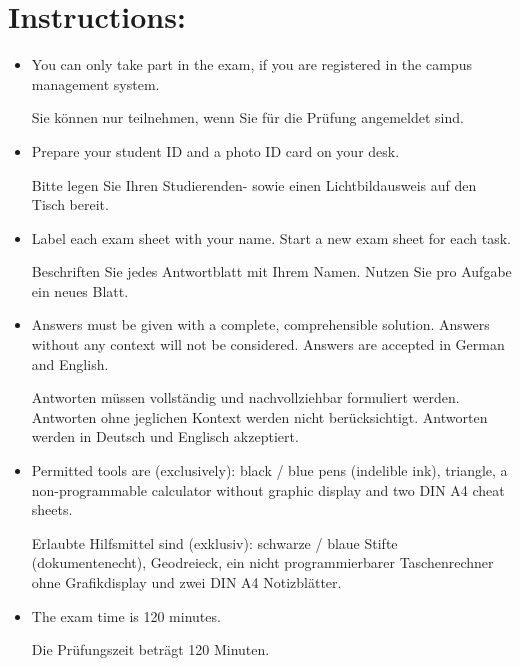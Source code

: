 \section*{\hspace*{2mm}Instructions:}
\begin{itemize}
	\item You can only take part in the exam, if you are registered in the campus management system.

	      \begin{germanblock}
		      Sie können nur teilnehmen, wenn Sie für die Prüfung angemeldet sind.
	      \end{germanblock}
	\item Prepare your student ID and a photo ID card on your desk.

	      \begin{germanblock}
		      Bitte legen Sie Ihren Studierenden- sowie einen Lichtbildausweis auf den Tisch bereit.
	      \end{germanblock}
	\item Label each exam sheet with your name. Start a new exam sheet for each task.

	      \begin{germanblock}
		      Beschriften Sie jedes Antwortblatt mit Ihrem Namen. Nutzen Sie pro  Aufgabe ein neues Blatt.
	      \end{germanblock}
	\item Answers must be given with a complete, comprehensible solution. Answers without any context will not be considered. Answers are accepted in German and English.

	      \begin{germanblock}
		      Antworten müssen vollständig und nachvollziehbar formuliert werden. Antworten ohne jeglichen Kontext werden nicht berücksichtigt. Antworten werden in Deutsch und Englisch akzeptiert.
	      \end{germanblock}
	\item Permitted tools are (exclusively): black / blue pens (indelible ink), triangle, a non-programmable calculator without graphic display and two DIN A4 cheat sheets.

	      \begin{germanblock}
		      Erlaubte Hilfsmittel sind (exklusiv): schwarze / blaue Stifte (dokumentenecht), Geodreieck, ein nicht programmierbarer Taschenrechner ohne Grafikdisplay und zwei DIN A4 Notizblätter.
	      \end{germanblock}
	\item The exam time is 120 minutes.

	      \begin{germanblock}
		      Die Prüfungszeit beträgt 120 Minuten.
	      \end{germanblock}
\end{itemize}


